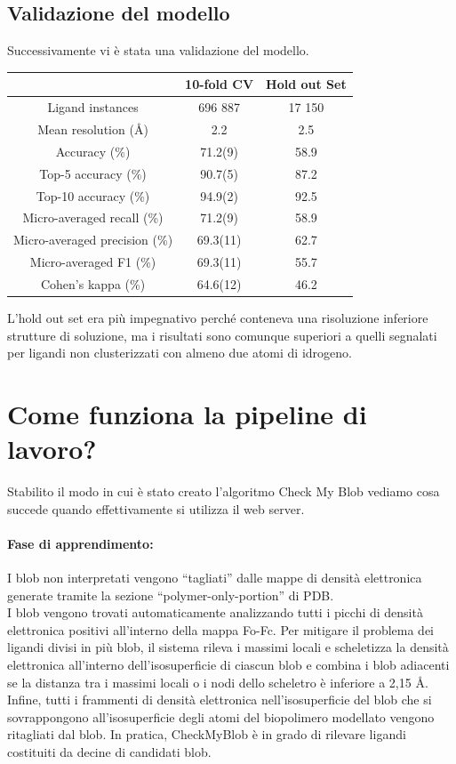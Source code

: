\documentclass{article}
\begin{document}
\subsection{Validazione del modello}
Successivamente vi è stata una validazione del modello.
\begin{center}
  \begin{tabular}{c|c|c}
  \toprule
    & 10-fold CV & Hold out Set\\
    \midrule
    Ligand instances & 696 887 & 17 150 \\
    Mean resolution (Å) & 2.2 & 2.5 \\
    Accuracy (\%) & 71.2(9) & 58.9 \\
    Top-5 accuracy (\%) & 90.7(5) & 87.2 \\
    Top-10 accuracy (\%) & 94.9(2) & 92.5 \\
    Micro-averaged recall (\%) & 71.2(9) & 58.9 \\
    Micro-averaged precision (\%) & 69.3(11) & 62.7 \\
    Micro-averaged F1 (\%) & 69.3(11) & 55.7 \\
    Cohen's kappa (\%) & 64.6(12) & 46.2 \\
    \bottomrule
  \end{tabular}
\end{center}
L'hold out set era più impegnativo perché conteneva una risoluzione inferiore strutture di soluzione, ma i risultati sono comunque superiori a quelli segnalati per ligandi non clusterizzati con almeno due atomi di idrogeno.

\section{Come funziona la pipeline di lavoro?}
Stabilito il modo in cui è stato creato l'algoritmo Check My Blob vediamo cosa succede quando effettivamente si utilizza il web server.
\paragraph*{Fase di apprendimento:} I blob non interpretati vengono “tagliati” dalle mappe di densità elettronica generate tramite la sezione “polymer-only-portion” di PDB.\\
I blob vengono trovati automaticamente analizzando tutti i picchi di densità elettronica positivi all'interno della mappa Fo-Fc. Per mitigare il problema dei ligandi divisi in più blob, il sistema rileva i massimi locali e scheletizza la densità elettronica all'interno dell'isosuperficie di ciascun blob e 
combina i blob adiacenti se la distanza tra i massimi locali o i nodi dello scheletro è inferiore a 2,15 Å. Infine, tutti i frammenti di densità elettronica nell'isosuperficie del blob che si sovrappongono all'isosuperficie degli atomi del biopolimero modellato vengono ritagliati dal blob. In pratica, CheckMyBlob è in grado di rilevare ligandi costituiti da decine di candidati blob.
\end{document}
